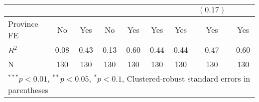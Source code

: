 \begin{tabular}{l c c c c c c c c }
                &              &          &              &               &          &          & $(0.17)$ &              \\
\hline
Province FE & No & Yes & No& Yes&Yes &Yes & Yes& Yes\\ 
\hline
$R^2$           & 0.08         & 0.43     & 0.13         & 0.60          & 0.44     & 0.44     & 0.47     & 0.60         \\
N               & 130          & 130      & 130          & 130           & 130      & 130      & 130      & 130          \\
\hline
\multicolumn{9}{l}{\scriptsize{$^{***}p<0.01$, $^{**}p<0.05$, $^*p<0.1$, Clustered-robust standard errors in parentheses}}
\end{tabular}
